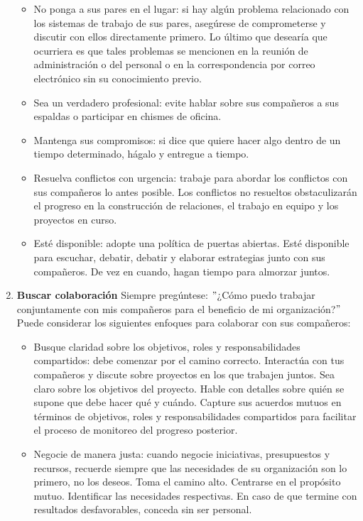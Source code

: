 \documentclass[10pt]{book}
\begin{document}
\begin{enumerate}[\bfseries 1.]
\begin{itemize}
\item No ponga a sus pares en el lugar: si hay algún problema relacionado con los sistemas de trabajo de sus pares, asegúrese de comprometerse y discutir con ellos directamente primero. Lo último que desearía que ocurriera es que tales problemas se mencionen en la reunión de administración o del personal o en la correspondencia por correo electrónico sin su conocimiento previo.
\item Sea un verdadero profesional: evite hablar sobre sus compañeros a sus espaldas o participar en chismes de oficina.
\item Mantenga sus compromisos: si dice que quiere hacer algo dentro de un tiempo determinado, hágalo y entregue a tiempo.
\item Resuelva conflictos con urgencia: trabaje para abordar los conflictos con sus compañeros lo antes posible. Los conflictos no resueltos obstaculizarán el progreso en la construcción de relaciones, el trabajo en equipo y los proyectos en curso.
\item Esté disponible: adopte una política de puertas abiertas. Esté disponible para escuchar, debatir, debatir y elaborar estrategias junto con sus compañeros. De vez en cuando, hagan tiempo para almorzar juntos.
\end{itemize}
\item \textbf{Buscar colaboración}
Siempre pregúntese: $"$¿Cómo puedo trabajar conjuntamente con mis compañeros para el beneficio de mi organización?$"$\\
Puede considerar los siguientes enfoques para colaborar con sus compañeros:
\begin{itemize}
\item Busque claridad sobre los objetivos, roles y responsabilidades compartidos: debe comenzar por el camino correcto. Interactúa con tus compañeros y discute sobre proyectos en los que trabajen juntos. Sea claro sobre los objetivos del proyecto. Hable con detalles sobre quién se supone que debe hacer qué y cuándo. Capture sus acuerdos mutuos en términos de objetivos, roles y responsabilidades compartidos para facilitar el proceso de monitoreo del progreso posterior.
\item Negocie de manera justa: cuando negocie iniciativas, presupuestos y recursos, recuerde siempre que las necesidades de su organización son lo primero, no los deseos. Toma el camino alto. Centrarse en el propósito mutuo. Identificar las necesidades respectivas. En caso de que termine con resultados desfavorables, conceda sin ser personal.

\end{itemize}
\end{enumerate}
\end{document}
